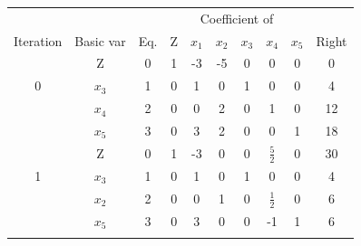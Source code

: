 \documentclass[12pt]{article}
\newcommand{\thline}{ \noalign{\global\arrayrulewidth1pt}
 \hline
 \noalign{\global\arrayrulewidth0.4pt}}
\begin{document}
  \begin{tabular}{|cc|c|c|ccccc|c|} \hline 
    \multicolumn{2}{c|}{}  &           & \multicolumn{6}{|c|}{Coefficient of} &                                                                                                                          \\ 
    Iteration              & Basic var & Eq.                                  & Z & $x_1$                  & $x_2$                   & $x_3$ & $x_4$          & $x_5$          & Right                   \\ \hline 
                           & Z         & 0                                    & 1 & -3                     & -5                      & 0     & 0              & 0              & 0                       \\ \cline{6-6}
                         0 & $x_3$     & 1                                    & 0 & 1                      & \multicolumn{1}{|c|}{0} & 1     & 0              & 0              & 4                       \\ \cline{5-10}
                           & $x_4$     & 2                                    & 0 & 0                      & \multicolumn{1}{|c|}{2} & 0     & 1              & 0              & \multicolumn{1}{c|}{12} \\ \cline{5-10}
                           & $x_5$     & 3                                    & 0 & 3                      & \multicolumn{1}{|c|}{2} & 0     & 0              & 1              & 18                      \\ \thline 
                           & Z         & 0                                    & 1 & -3                     & 0                       & 0     & $\frac{5}{2}$  & 0              & 30                      \\ \cline{5-5}
                         1 & $x_3$     & 1                                    & 0 & \multicolumn{1}{c|}{1} & 0                       & 1     & 0              & 0              & 4                       \\ 
                           & $x_2$     & 2                                    & 0 & \multicolumn{1}{c|}{0} & 1                       & 0     & $\frac{1}{2}$  & 0              & 6                       \\ \cline{5-10}
                           & $x_5$     & 3                                    & 0 & \multicolumn{1}{c|}{3} & 0                       & 0     & -1             & 1              & \multicolumn{1}{c|}{6}  \\  \thline

\end{tabular}
\end{document}
